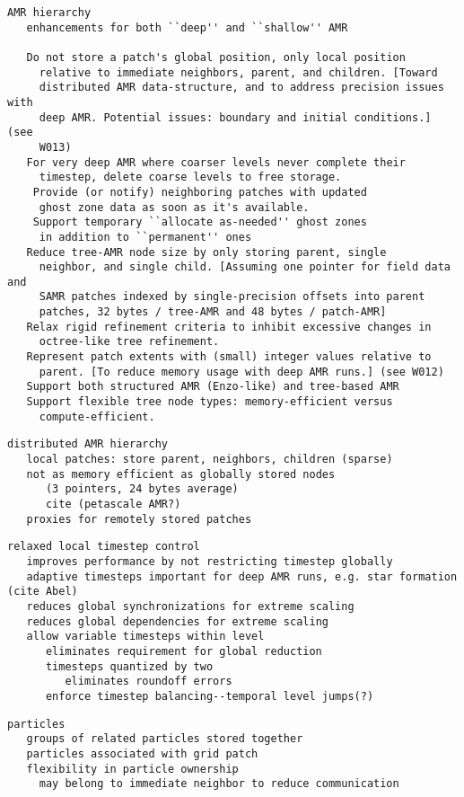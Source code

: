 \documentclass[14pt,letter]{article}
\begin{document}
\begin{verbatim}
AMR hierarchy
   enhancements for both ``deep'' and ``shallow'' AMR

   Do not store a patch's global position, only local position
     relative to immediate neighbors, parent, and children. [Toward
     distributed AMR data-structure, and to address precision issues with
     deep AMR. Potential issues: boundary and initial conditions.] (see
     W013)
   For very deep AMR where coarser levels never complete their
     timestep, delete coarse levels to free storage.
    Provide (or notify) neighboring patches with updated
     ghost zone data as soon as it's available.
    Support temporary ``allocate as-needed'' ghost zones
     in addition to ``permanent'' ones
   Reduce tree-AMR node size by only storing parent, single
     neighbor, and single child. [Assuming one pointer for field data and
     SAMR patches indexed by single-precision offsets into parent
     patches, 32 bytes / tree-AMR and 48 bytes / patch-AMR]
   Relax rigid refinement criteria to inhibit excessive changes in
     octree-like tree refinement.
   Represent patch extents with (small) integer values relative to
     parent. [To reduce memory usage with deep AMR runs.] (see W012)
   Support both structured AMR (Enzo-like) and tree-based AMR
   Support flexible tree node types: memory-efficient versus
     compute-efficient.
\end{verbatim}

\begin{verbatim}
distributed AMR hierarchy
   local patches: store parent, neighbors, children (sparse)
   not as memory efficient as globally stored nodes 
      (3 pointers, 24 bytes average)
      cite (petascale AMR?)
   proxies for remotely stored patches
\end{verbatim}

\begin{verbatim}
relaxed local timestep control
   improves performance by not restricting timestep globally
   adaptive timesteps important for deep AMR runs, e.g. star formation (cite Abel)
   reduces global synchronizations for extreme scaling
   reduces global dependencies for extreme scaling
   allow variable timesteps within level
      eliminates requirement for global reduction
      timesteps quantized by two
         eliminates roundoff errors
      enforce timestep balancing--temporal level jumps(?)
\end{verbatim}

\begin{verbatim}
particles
   groups of related particles stored together
   particles associated with grid patch
   flexibility in particle ownership
     may belong to immediate neighbor to reduce communication
\end{verbatim}
\end{document}
